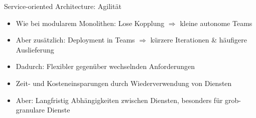 \begin{frame}{Service-oriented Architecture: Agilität}
    \begin{itemize}
        \item Wie bei modularem Monolithen: Lose Kopplung $\Rightarrow$ kleine autonome Teams
        \item Aber zusätzlich: Deployment in Teams $\Rightarrow$ kürzere Iterationen \& häufigere Auslieferung
        \item Dadurch: Flexibler gegenüber wechselnden Anforderungen
        \item Zeit- und Kosteneinsparungen durch Wiederverwendung von Diensten
        \item Aber: Langfristig Abhängigkeiten zwischen Diensten, besonders für grob-granulare Dienste
    \end{itemize}
\end{frame}